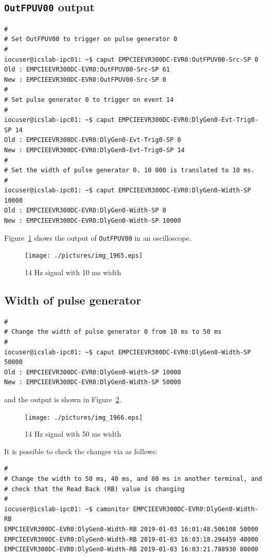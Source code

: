 \documentclass[11pt
  , a4paper
  , article
  , oneside
  , showtrims
]{memoir}
\begin{document}
{\subsection{\texttt{OutFPUV00} output}
\begin{lstlisting}[style=termstyle]
#
# Set OutFPUV00 to trigger on pulse generator 0
#
iocuser@icslab-ipc01: ~$ caput EMPCIEEVR300DC-EVR0:OutFPUV00-Src-SP 0
Old : EMPCIEEVR300DC-EVR0:OutFPUV00-Src-SP 61
New : EMPCIEEVR300DC-EVR0:OutFPUV00-Src-SP 0
#
# Set pulse generator 0 to trigger on event 14
#
iocuser@icslab-ipc01: ~$ caput EMPCIEEVR300DC-EVR0:DlyGen0-Evt-Trig0-SP 14
Old : EMPCIEEVR300DC-EVR0:DlyGen0-Evt-Trig0-SP 0
New : EMPCIEEVR300DC-EVR0:DlyGen0-Evt-Trig0-SP 14
#
# Set the width of pulse generator 0. 10 000 is translated to 10 ms.
#
iocuser@icslab-ipc01: ~$ caput EMPCIEEVR300DC-EVR0:DlyGen0-Width-SP 10000
Old : EMPCIEEVR300DC-EVR0:DlyGen0-Width-SP 0
New : EMPCIEEVR300DC-EVR0:DlyGen0-Width-SP 10000
\end{lstlisting}

Figure~\ref{fig:14Hz} shows the output of \texttt{OutFPUV00} in an oscilloscope.\\

\begin{figure}[!ht]
  \centering
    \texttt{[image: ./pictures/img\_1965.eps]}
  \caption{14 Hz signal with 10 ms width}
  \label{fig:14Hz}
\end{figure}

\subsection{Width of pulse generator}
\begin{lstlisting}[style=termstyle]
#
# Change the width of pulse generator 0 from 10 ms to 50 ms
#
iocuser@icslab-ipc01: ~$ caput EMPCIEEVR300DC-EVR0:DlyGen0-Width-SP 50000
Old : EMPCIEEVR300DC-EVR0:DlyGen0-Width-SP 10000
New : EMPCIEEVR300DC-EVR0:DlyGen0-Width-SP 50000
\end{lstlisting}
and the output is shown in Figure~\ref{fig:50ms}.\\

\begin{figure}[!ht]
  \centering
    \texttt{[image: ./pictures/img\_1966.eps]}
  \caption{14 Hz signal with 50 ms width}
  \label{fig:50ms}
\end{figure}

It is possible to check the changes via  as follows:
\begin{lstlisting}[style=termstyle]
#
# Change the width to 50 ms, 40 ms, and 80 ms in another terminal, and
# check that the Read Back (RB) value is changing
#
iocuser@icslab-ipc01: ~$ camonitor EMPCIEEVR300DC-EVR0:DlyGen0-Width-RB
EMPCIEEVR300DC-EVR0:DlyGen0-Width-RB 2019-01-03 16:01:48.506108 50000
EMPCIEEVR300DC-EVR0:DlyGen0-Width-RB 2019-01-03 16:03:18.294459 40000
EMPCIEEVR300DC-EVR0:DlyGen0-Width-RB 2019-01-03 16:03:21.788930 80000
\end{lstlisting}

}
\end{document}
